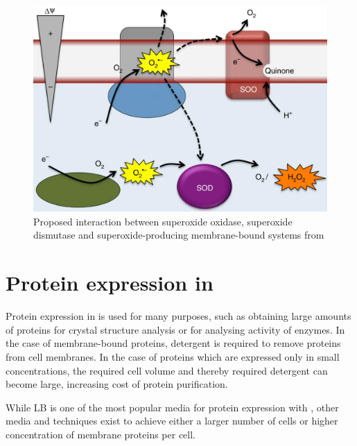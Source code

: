 \begin{figure}
	\centering
	\includegraphics[width=\linewidth]{../img/superoxide_activity.png}
	\caption{Proposed interaction between superoxide oxidase, superoxide dismutase and superoxide-producing membrane-bound systems from \cite{superoxide_salvaging}}
	\label{fig:superoxide_activity}
\end{figure}

\section{Protein expression in \ecoli{}}

Protein expression in \ecoli{} is used for many purposes, such as obtaining
large amounts of proteins for crystal structure analysis or for analysing
activity of enzymes. In the case of membrane-bound proteins, detergent is
required to remove proteins from cell membranes. In the case of proteins which
are expressed only in small concentrations, the required cell volume and
thereby required detergent can become large, increasing cost of protein
purification.\cite{memstar}

While LB is one of the most popular media for protein expression with \ecoli{},
other media and techniques exist to achieve either a larger number of cells or
higher concentration of membrane proteins per cell.

